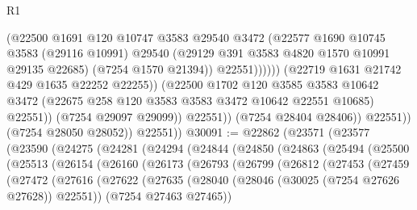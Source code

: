\begin{lexlean}{R1}
\begin{coremodule}
                                    (@22500
                                      @1691
                                      @120
                                      @10747
                                      @3583
                                      @29540
                                      @3472
                                      (@22577
                                        @1690
                                        @10745
                                        @3583
                                        (@29116 @10991)
                                        @29540
                                        (@29129 @391 @3583 @4820 @1570 @10991 @29135 @22685)
                                        (@7254 @1570 @21394))
                                      @22551))))))
                          (@22719 @1631 @21742 @429 @1635 @22252 @22255))
                        (@22500
                          @1702
                          @120
                          @3585
                          @3583
                          @10642
                          @3472
                          (@22675 @258 @120 @3583 @3583 @3472 @10642 @22551 @10685)
                          @22551))
                      (@7254 @29097 @29099))
                    @22551))
                (@7254 @28404 @28406))
              @22551))
          (@7254 @28050 @28052))
        @22551))
@30091 := @22862
    (@23571
      (@23577
        (@23590
          (@24275
            (@24281
              (@24294
                (@24844
                  (@24850
                    (@24863
                      (@25494
                        (@25500
                          (@25513
                            (@26154
                              (@26160
                                (@26173
                                  (@26793
                                    (@26799
                                      (@26812
                                        (@27453
                                          (@27459
                                            (@27472
                                              (@27616
                                                (@27622
                                                  (@27635
                                                    (@28040
                                                      (@28046
                                                        (@30025 (@7254 @27626 @27628))
                                                        @22551))
                                                    (@7254 @27463 @27465))

\end{coremodule}
\end{lexlean}
